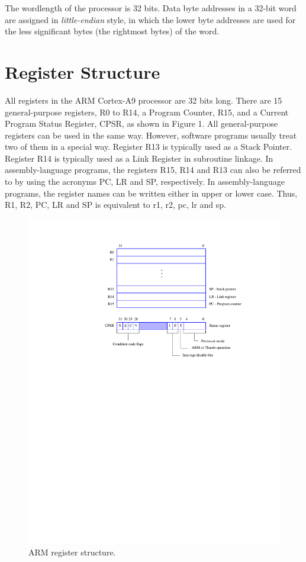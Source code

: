 \documentclass[11pt, twoside, pdftex]{article}
\begin{document}
The wordlength of the processor is 32 bits. Data byte addresses in a 32-bit word are assigned in {\it little-endian} style, 
in which the lower byte addresses are used for the less
significant bytes (the rightmost bytes) of the word. 

\section{Register Structure}
All registers in the ARM Cortex-A9 processor are 32 bits long.
There are 15 general-purpose registers, R0 to R14,
a Program Counter, R15, and a Current Program Status
Register, CPSR, as shown in Figure 1.
All general-purpose registers can be used in the same way. 
However, software programs usually treat two of them in a special 
way. Register R13 is typically used as a Stack Pointer.
Register R14 is typically used as a Link Register in subroutine linkage. In assembly-language programs, the registers
R15, R14 and R13 can also be referred to by using the acronyms
PC, LR and SP, respectively. In assembly-language programs, the
register names can be written either in upper or lower case.
Thus, R1, R2, PC, LR and SP is equivalent to r1, r2, pc, lr and
sp.

\begin{figure}[H]
   \begin{center}
      \includegraphics[scale=1]{figures/figure1.pdf}
   \caption{ARM register structure.} 
	 \label{fig:1}
	 \end{center}
\end{figure}
\end{document}
